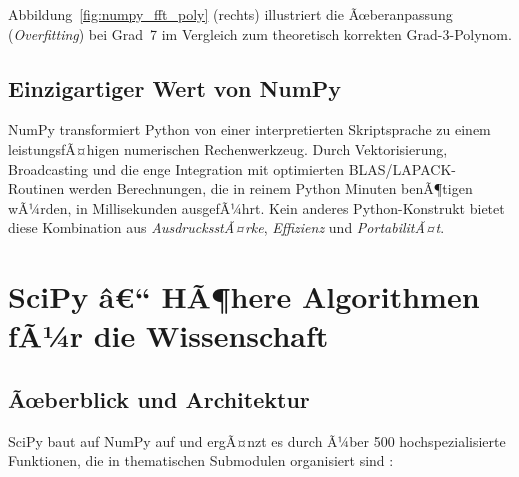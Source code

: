 \documentclass[12pt, a4paper]{article}
\begin{document}
Abbildung~\ref{fig:numpy_fft_poly} (rechts) illustriert die Ãœberanpassung
(\emph{Overfitting}) bei Grad~7 im Vergleich zum theoretisch korrekten
Grad-3-Polynom.

\subsection{Einzigartiger Wert von NumPy}

NumPy transformiert Python von einer interpretierten Skriptsprache zu
einem leistungsfÃ¤higen numerischen Rechenwerkzeug. Durch Vektorisierung,
Broadcasting und die enge Integration mit optimierten BLAS/LAPACK-Routinen
werden Berechnungen, die in reinem Python Minuten benÃ¶tigen wÃ¼rden, in
Millisekunden ausgefÃ¼hrt. Kein anderes Python-Konstrukt bietet diese
Kombination aus \emph{AusdrucksstÃ¤rke}, \emph{Effizienz} und
\emph{PortabilitÃ¤t}.

\section{SciPy â€“ HÃ¶here Algorithmen fÃ¼r die Wissenschaft}
\label{sec:scipy}

\subsection{Ãœberblick und Architektur}
\label{subsec:scipy-overview}

SciPy baut auf NumPy auf und ergÃ¤nzt es durch Ã¼ber 500 hochspezialisierte
Funktionen, die in thematischen Submodulen organisiert sind
\cite{virtanen2020scipy}:
\end{document}
